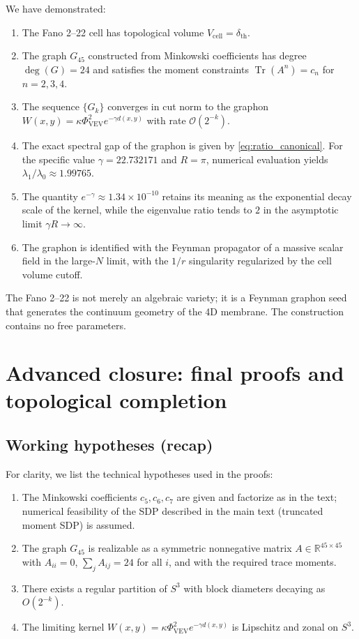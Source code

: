 \documentclass[12pt]{article}
\numberwithin{equation}{section}
\newcommand{\VEV}{\Phi_{\mathrm{VEV}}}
\newcommand{\dth}{\delta_{\mathrm{th}}}
\newcommand{\SphereR}{R}
\begin{document}
We have demonstrated:
\begin{enumerate}
    \item The Fano 2--22 cell has topological volume \(V_{\text{cell}} = \dth\).
    \item The graph \(G_{45}\) constructed from Minkowski coefficients has degree \(\deg(G) = 24\) and satisfies the moment constraints \(\operatorname{Tr}(A^n) = c_n\) for \(n = 2,3,4\).
    \item The sequence \(\{G_k\}\) converges in cut norm to the graphon \(W(x,y) = \kappa \VEV^2 e^{-\gamma d(x,y)}\) with rate \(\mathcal{O}(2^{-k})\).
    \item The exact spectral gap of the graphon is given by \eqref{eq:ratio_canonical}. For the specific value \(\gamma = 22.732171\) and \(\SphereR = \pi\), numerical evaluation yields \(\lambda_1/\lambda_0 \approx 1.99765\).
    \item The quantity \(e^{-\gamma} \approx 1.34 \times 10^{-10}\) retains its meaning as the exponential decay scale of the kernel, while the eigenvalue ratio tends to \(2\) in the asymptotic limit \(\gamma \SphereR \to \infty\).
    \item The graphon is identified with the Feynman propagator of a massive scalar field in the large-\(N\) limit, with the \(1/r\) singularity regularized by the cell volume cutoff.
\end{enumerate}

The Fano 2--22 is not merely an algebraic variety; it is a Feynman graphon seed that generates the continuum geometry of the 4D membrane. The construction contains no free parameters.

\section{Advanced closure: final proofs and topological completion}
\label{sec:advanced_closure}

\subsection{Working hypotheses (recap)}

For clarity, we list the technical hypotheses used in the proofs:
\begin{enumerate}
  \item[I1.] The Minkowski coefficients \(c_5,c_6,c_7\) are given and factorize as in the text; numerical feasibility of the SDP described in the main text (truncated moment SDP) is assumed.
  \item[I2.] The graph \(G_{45}\) is realizable as a symmetric nonnegative matrix \(A\in\mathbb{R}^{45\times45}\) with \(A_{ii}=0\), \(\sum_j A_{ij}=24\) for all \(i\), and with the required trace moments.
  \item[I3.] There exists a regular partition of \(S^3\) with block diameters decaying as \(O(2^{-k})\).
  \item[I4.] The limiting kernel \(W(x,y)=\kappa\VEV^2 e^{-\gamma d(x,y)}\) is Lipschitz and zonal on \(S^3\).
\end{enumerate}
\end{document}
